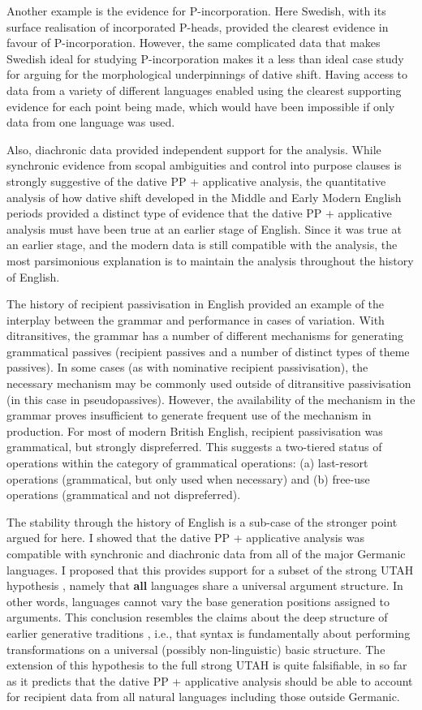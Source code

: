 Another example is the evidence for P-incorporation. Here Swedish, with its surface realisation of incorporated P-heads, provided the clearest evidence in favour of P-incorporation. However, the same complicated data that makes Swedish ideal for studying P-incorporation makes it a less than ideal case study for arguing for the morphological underpinnings of dative shift. Having access to data from a variety of different languages enabled using the clearest supporting evidence for each point being made, which would have been impossible if only data from one language was used.

Also, diachronic data provided independent support for the analysis. While synchronic evidence from scopal ambiguities and control into purpose clauses is strongly suggestive of the dative PP + applicative analysis, the quantitative analysis of how dative shift developed in the Middle and Early Modern English periods provided a distinct type of evidence that the dative PP + applicative analysis must have been true at an earlier stage of English. Since it was true at an earlier stage, and the modern data is still compatible with the analysis, the most parsimonious explanation is to maintain the analysis throughout the history of English.

The history of recipient passivisation in English provided an example of the interplay between the grammar and performance in cases of variation. With ditransitives, the grammar has a number of different mechanisms for generating grammatical passives (recipient passives and a number of distinct types of theme passives). In some cases (as with nominative recipient passivisation), the necessary mechanism may be commonly used outside of ditransitive passivisation (in this case in pseudopassives). However, the availability of the mechanism in the grammar proves insufficient to generate frequent use of the mechanism in production. For most of modern British English, recipient passivisation was grammatical, but strongly dispreferred. This suggests a two-tiered status of operations within the category of grammatical operations: (a) last-resort operations (grammatical, but only used when necessary) and (b) free-use operations (grammatical and not dispreferred).

The stability through the history of English is a sub-case of the stronger point argued for here. I showed that the dative PP + applicative analysis was compatible with synchronic and diachronic data from all of the major Germanic languages. I proposed that this provides support for a subset of the strong UTAH hypothesis \citep{Baker.1988}, namely that \textbf{all} languages share a universal argument structure. In other words, languages cannot vary the base generation positions assigned to arguments. This conclusion resembles the claims about the deep structure of earlier generative traditions \citep{Chomsky.1965,Chomsky.1981}, i.e., that syntax is fundamentally about performing transformations on a universal (possibly non-linguistic) basic structure. The extension of this hypothesis to the full strong UTAH is quite falsifiable, in so far as it predicts that the dative PP + applicative analysis should be able to account for recipient data from all natural languages including those outside Germanic.

